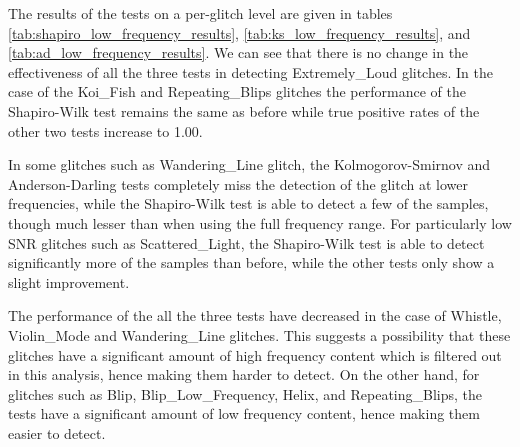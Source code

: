 \documentclass[12pt]{article}
\begin{document}
\noindent The results of the tests on a per-glitch level are given in tables \ref{tab:shapiro_low_frequency_results}, \ref{tab:ks_low_frequency_results}, and \ref{tab:ad_low_frequency_results}. We can see that there is no change in the effectiveness of all the three tests in detecting Extremely\_Loud glitches. In the case of the Koi\_Fish and Repeating\_Blips glitches the performance of the Shapiro-Wilk test remains the same as before while true positive rates of the other two tests increase to 1.00.

\medskip
\noindent In some glitches such as Wandering\_Line glitch, the Kolmogorov-Smirnov and Anderson-Darling tests completely miss the detection of the glitch at lower frequencies, while the Shapiro-Wilk test is able to detect a few of the samples, though much lesser than when using the full frequency range. For particularly low SNR glitches such as Scattered\_Light, the Shapiro-Wilk test is able to detect significantly more of the samples than before, while the other tests only show a slight improvement.

\medskip
\noindent The performance of the all the three tests have decreased in the case of Whistle, Violin\_Mode and Wandering\_Line glitches. This suggests a possibility that these glitches have a significant amount of high frequency content which is filtered out in this analysis, hence making them harder to detect. On the other hand, for glitches such as Blip, Blip\_Low\_Frequency, Helix, and Repeating\_Blips, the tests have a significant amount of low frequency content, hence making them easier to detect.
\end{document}

